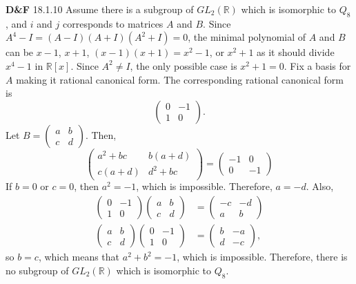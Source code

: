 \documentclass[a4paper, 12pt]{article}
\theoremstyle{Mydefinition}
\theoremstyle{Mytheorem}
\begin{document}
\noindent \textbf{D\&F} 18.1.10
Assume there is a subgroup of $GL_2(\mathbb{R})$ which is isomorphic to $Q_8$, and $i$ and $j$ corresponds to matrices $A$ and $B$. Since $A^4-I =(A-I)(A+I)(A^2+I)= 0$, the minimal polynomial of $A$ and $B$ can be $x-1$, $x+1$, $(x-1)(x+1)=x^2-1$, or $x^2+1$ as it should divide $x^4-1$ in $\mathbb{R}[x]$. Since $A^2\neq I$, the only possible case is $x^2+1=0$. Fix a basis for $A$ making it rational canonical form. The corresponding rational canonical form is
\begin{equation}
    \begin{pmatrix}
        0 & -1\\
        1 & 0
    \end{pmatrix}.
\end{equation}
Let $B=\begin{pmatrix}
    a & b\\ c & d
\end{pmatrix}$. Then,
\begin{equation}
    \begin{pmatrix}
        a^2+bc & b(a+d)\\
        c(a+d) & d^2+bc
    \end{pmatrix} = \begin{pmatrix}
        -1 & 0\\
        0 & -1
    \end{pmatrix}
\end{equation}
If $b=0$ or $c=0$, then $a^2 = -1$, which is impossible. Therefore, $a=-d$. Also,
\begin{equation}
\begin{split}
    \begin{pmatrix}
        0 & -1\\
        1 & 0
    \end{pmatrix}\begin{pmatrix}
    a & b\\ c & d
\end{pmatrix} &= \begin{pmatrix}
    -c & -d \\
    a & b
\end{pmatrix}\\
\begin{pmatrix}
    a & b\\ c & d
\end{pmatrix}\begin{pmatrix}
        0 & -1\\
        1 & 0
    \end{pmatrix} &= \begin{pmatrix}
    b & -a \\
    d & -c
\end{pmatrix},
\end{split}
\end{equation}
so $b=c$, which means that $a^2+b^2 = -1$, which is impossible. Therefore, there is no subgroup of $GL_2(\mathbb{R})$ which is isomorphic to $Q_8$.\\
\end{document}

